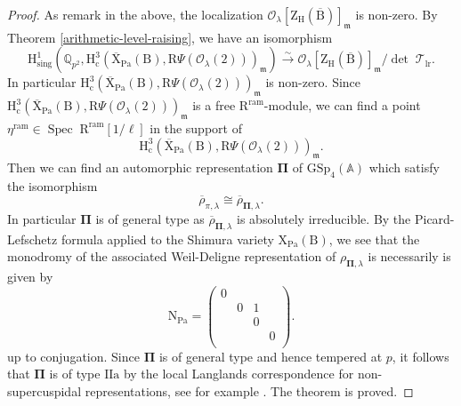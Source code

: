 \documentclass[10pt]{amsart}
\numberwithin{equation}{section}
\theoremstyle{definition}
\def\GSp{\mathrm{GSp}}
\def\lr{\mathrm{lr}}
\def\ram{\mathrm{ram}}
\def\Pa{\mathrm{Pa}}
\def\sing{\mathrm{sing}}
\DeclareMathOperator{\Spec}{Spec}
\def\calO{\mathcal{O}}
\def\calT{\mathcal{T}}
\def\fracm{\mathfrak{m}}
\def\QQ{\mathbb{Q}}
\def\rma{\mathrm{a}}
\def\rmc{\mathrm{c}}
\def\rmB{\mathrm{B}}
\def\rmH{\mathrm{H}}
\def\rmI{\mathrm{I}}
\def\rmN{\mathrm{N}}
\def\rmR{\mathrm{R}}
\def\rmX{\mathrm{X}}
\def\rmZ{\mathrm{Z}}
\begin{document}
\begin{proof}
As remark in the above, the localization $\calO_{\lambda}[\rmZ_{\rmH}(\overline{\rmB})]_{\fracm}$
is non-zero. By Theorem \ref{arithmetic-level-raising}, we have an isomorphism 
\begin{equation*}
\rmH^{1}_{\sing}(\QQ_{p^{2}}, \rmH^{3}_{\rmc}(\overline{\rmX}_{\Pa}(\rmB), \rmR\Psi(\calO_{\lambda}(2)))_{\fracm})\xrightarrow{\sim}\calO_{\lambda}[\rmZ_{\rmH}(\overline{\rmB})]_{\fracm}/\det\phantom{.}\calT_{\lr}.
\end{equation*}
In particular $\rmH^{3}_{\rmc}(\overline{\rmX}_{\Pa}(\rmB), \rmR\Psi(\calO_{\lambda}(2)))_{\fracm}$ is non-zero. Since  $\rmH^{3}_{\rmc}(\overline{\rmX}_{\Pa}(\rmB), \rmR\Psi(\calO_{\lambda}(2)))_{\fracm}$ is a free $\rmR^{\ram}$-module, we can find a point $\eta^{\ram}\in \Spec\phantom{.}\rmR^{\ram}[1/\ell]$ in the support of 
\begin{equation*}
\rmH^{3}_{\rmc}(\overline{\rmX}_{\Pa}(\rmB), \rmR\Psi(\calO_{\lambda}(2)))_{\fracm}.
\end{equation*}
Then we can find  an automorphic representation $\mathbf{\Pi}$ of $\GSp_{4}(\mathbb{A})$ which satisfy the isomorphism 
\begin{equation*}
\overline{\rho}_{\pi, \lambda}\cong \overline{\rho}_{\mathbf{\Pi}, \lambda}.
\end{equation*}
In particular $\mathbf{\Pi}$ is of general type as $\overline{\rho}_{\mathbf{\Pi}, \lambda}$ is absolutely irreducible. By the Picard-Lefschetz formula applied to the Shimura variety ${\rmX}_{\Pa}(\rmB)$, we see that the monodromy of the associated Weil-Deligne representation of  $\rho_{\mathbf{\Pi}, \lambda}$ is necessarily is given by 
\begin{equation*}
\rmN_{\Pa}=\begin{pmatrix}0&&&\\&0&1&\\&&0&\\&&&0\\ \end{pmatrix}.
\end{equation*}
up to conjugation. Since $\mathbf{\Pi}$ is of general type and hence tempered at $p$, it follows that $\mathbf{\Pi}$ is of type $\rmI\rmI\rma$ by the local Langlands correspondence for non-supercuspidal representations, see for example \cite[Table 2]{Sch-Iwahori}. The theorem is proved.
\end{proof}
\end{document}
